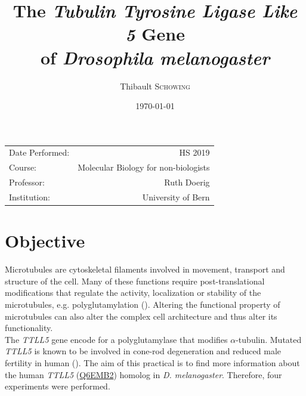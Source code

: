 \documentclass{article}
\title{The \textit{Tubulin Tyrosine Ligase Like 5} Gene \\ of \textit{Drosophila melanogaster}} %
\author{Thibault \textsc{Schowing}} %
\date{\today} %
\begin{document}
\maketitle %

\begin{center}
\begin{tabular}{l r}
Date Performed: & HS 2019 \\ %
Course: & Molecular Biology for non-biologists \\
Professor: & Ruth Doerig \\
Institution: & University of Bern %
\end{tabular}
\end{center}



\section*{Objective}

Microtubules are cytoskeletal filaments involved in movement, transport and structure of the cell. Many of these functions require post-translational modifications that regulate the activity, localization or stability of the microtubules, e.g. polyglutamylation (\cite{schaletzky_getting_2016}). Altering the functional property of microtubules can also alter the complex cell architecture and thus alter its functionality. \\

The \textit{TTLL5} gene encode for a polyglutamylase that modifies $\alpha$-tubulin. Mutated \textit{TTLL5} is known to be involved in cone-rod degeneration and reduced male fertility in human (\cite{bedoni_mutations_2016}). The aim of this practical is to find more information about the human \textit{TTLL5} (\href{https://www.uniprot.org/uniprot/Q6EMB2}{Q6EMB2}) homolog in \textit{D. melanogaster}. Therefore, four experiments were performed.
\end{document}
